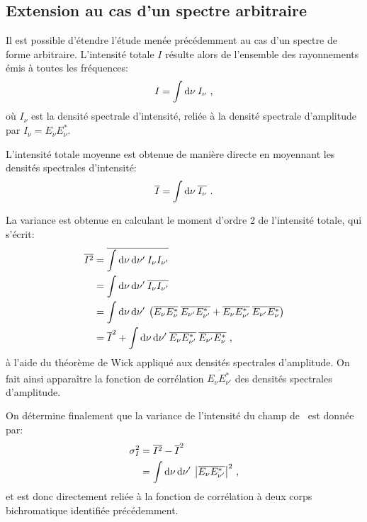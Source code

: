 \subsection{Extension au cas d'un spectre arbitraire}
Il est possible d'étendre l'étude menée précédemment au cas d'un spectre de forme arbitraire. L'intensité totale $I$ résulte alors de l'ensemble des rayonnements émis à toutes les fréquences:
\begin{equation}
I=\int{\mathop{}\mathopen{}\mathrm{d}\nu \: I_{\nu}} \text{ ,}
\end{equation}
où $I_{\nu}$ est la densité spectrale d'intensité, reliée à la densité spectrale d'amplitude par $I_{\nu}=E_{\nu}E^*_{\nu}$. 

L'intensité totale moyenne est obtenue de manière directe en moyennant les densités spectrales d'intensité:
\begin{equation}
\overline{I}=\int{\mathop{}\mathopen{}\mathrm{d}\nu \: \overline{I_{\nu}}} \text{ .}
\end{equation}

La variance est obtenue en calculant le moment d'ordre 2 de l'intensité totale, qui s'écrit:
\begin{align}
\overline{I^2} &= \overline{\int{\mathop{}\mathopen{}\mathrm{d}\nu\mathop{}\mathopen{}\mathrm{d}\nu' \: I_{\nu} I_{\nu'}}} \\
&= \int{\mathop{}\mathopen{}\mathrm{d}\nu\mathop{}\mathopen{}\mathrm{d}\nu' \: \overline{I_{\nu} I_{\nu'}}} \\
&=\int{\mathop{}\mathopen{}\mathrm{d}\nu\mathop{}\mathopen{}\mathrm{d}\nu' \: \left( \overline{E_{\nu} E^*_{\nu}} \: \overline{E_{\nu'} E^*_{\nu'}} + \overline{E_{\nu} E^*_{\nu'}} \: \overline{E_{\nu'} E^*_{\nu}} \right)} \\
&= \overline{I}^2 + \int{\mathop{}\mathopen{}\mathrm{d}\nu\mathop{}\mathopen{}\mathrm{d}\nu' \: \overline{E_{\nu}E^*_{\nu'}}\:\overline{E_{\nu'}E^*_{\nu}}} \text{ ,}
\end{align}
à l'aide du théorème de Wick appliqué aux densités spectrales d'amplitude. On fait ainsi apparaître la fonction de corrélation $\overline{E_{\nu}E^*_{\nu'}}$ des densités spectrales d'amplitude.

On détermine finalement que la variance de l'intensité du champ de \speckle\ est donnée par:
\begin{align}
\sigma_I^2 &= \overline{I^2} - \overline{I}^2 \\
&= \int{\mathop{}\mathopen{}\mathrm{d}\nu\mathop{}\mathopen{}\mathrm{d}\nu' \: \left|\overline{E_{\nu}E^*_{\nu'}} \right|^2} \text{ ,}
\end{align}
et est donc directement reliée à la fonction de corrélation à deux corps bichromatique identifiée précédemment.